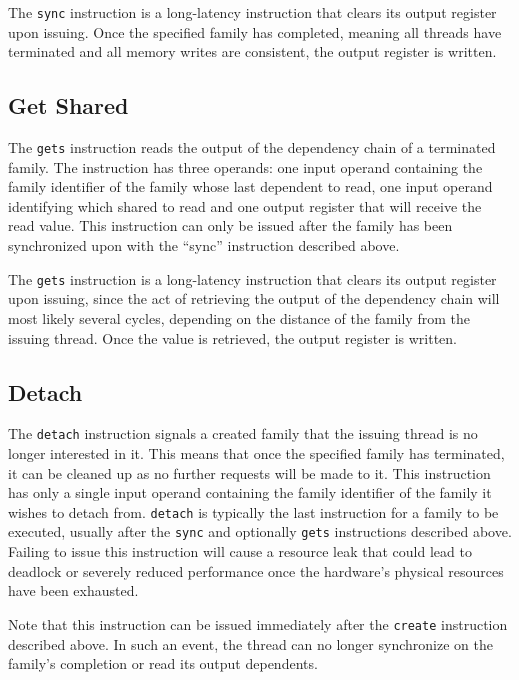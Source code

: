 The {\tt sync} instruction is a long-latency instruction that clears its output register upon issuing. Once the specified family has completed, meaning all threads have terminated and all memory writes are consistent, the output register is written.

\subsection{Get Shared}
The {\tt gets} instruction reads the output of the dependency chain of a terminated family. The instruction has three operands: one input operand containing the family identifier of the family whose last dependent to read, one input operand identifying which shared to read and one output register that will receive the read value. This instruction can only be issued after the family has been synchronized upon with the ``sync'' instruction described above.

The {\tt gets} instruction is a long-latency instruction that clears its output register upon issuing, since the act of retrieving the output of the dependency chain will most likely several cycles, depending on the distance of the family from the issuing thread. Once the value is retrieved, the output register is written.

\subsection{Detach}
The {\tt detach} instruction signals a created family that the issuing thread is no longer interested in it. This means that once the specified family has terminated, it can be cleaned up as no further requests will be made to it. This instruction has only a single input operand containing the family identifier of the family it wishes to detach from. {\tt detach} is typically the last instruction for a family to be executed, usually after the {\tt sync} and optionally {\tt gets} instructions described above. Failing to issue this instruction will cause a resource leak that could lead to deadlock or severely reduced performance once the hardware's physical resources have been exhausted.

Note that this instruction can be issued immediately after the {\tt create} instruction described above. In such an event, the thread can no longer synchronize on the family's completion or read its output dependents.